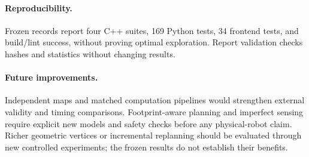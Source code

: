 \begin{samepage}
\paragraph{Reproducibility.} Frozen records report four C++ suites, 169 Python tests, 34 frontend tests, and build/lint success, without proving optimal exploration. Report validation checks hashes and statistics without changing results.
\par\end{samepage}

\begin{samepage}
\paragraph{Future improvements.} Independent maps and matched computation pipelines would strengthen external validity and timing comparisons. Footprint-aware planning and imperfect sensing require explicit new models and safety checks before any physical-robot claim. Richer geometric vertices or incremental replanning should be evaluated through new controlled experiments; the frozen results do not establish their benefits.
\par\end{samepage}
